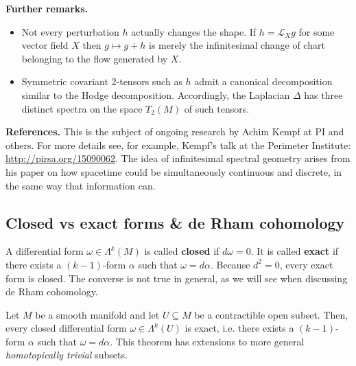\begin{mytheorem}
\noindent
\textbf{Further remarks.}
\begin{itemize}
\item Not every perturbation \(h\) actually changes the shape.  If \(h=\mathcal{L}_X g\) for some vector field \(X\) then \(g\mapsto g+h\) is merely the infinitesimal change of chart belonging to the flow generated by \(X\).
\item Symmetric covariant 2-tensors such as \(h\) admit a canonical decomposition similar to the Hodge decomposition.  Accordingly, the Laplacian \(\Delta\) has three distinct spectra on the space \(T_2(M)\) of such tensors.
\end{itemize}

\noindent
\textbf{References.}
This is the subject of ongoing research by Achim Kempf at PI and others.
For more details see, for example, Kempf's talk at the Perimeter Institute: \url{http://pirsa.org/15090062}.
The idea of infinitesimal spectral geometry arises from his paper on how spacetime could be simultaneously continuous and discrete, in the same way that information can.

\end{mytheorem}




\subsection{Closed vs exact forms \& de Rham cohomology} 


\begin{mytheorem}
A differential form \(\omega \in \Lambda^k (M)\) is called \textbf{closed} if \(d\omega = 0\).
It is called \textbf{exact} if there exists a \((k-1)\)-form \(\alpha\) such that \(\omega = d\alpha\).
Because \(d^2 = 0\), every exact form is closed.
The converse is not true in general, as we will see when discussing de Rham cohomology.
\end{mytheorem}


\begin{theorem}
Let \(M\) be a smooth manifold and let \(U \subseteq M\) be a contractible open subset.
Then, every closed differential form \(\omega \in \Lambda^k (U)\) is exact, i.e. there exists a \((k-1)\)-form \(\alpha\) such that \(\omega = d\alpha\).
This theorem has extensions to more general \emph{homotopically trivial} subsets.
\end{theorem}


